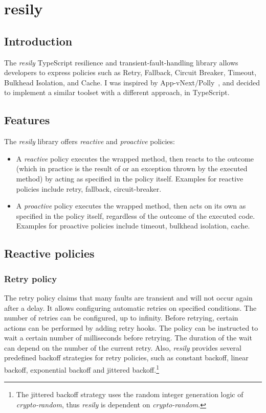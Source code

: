 \section{resily}

\subsection{Introduction}

The \emph{resily} TypeScript resilience and transient-fault-handling library allows developers to express policies such as Retry, Fallback, Circuit Breaker, Timeout, Bulkhead Isolation, and Cache. I was inspired by App-vNext/Polly~\cite{pollygithub}, and decided to implement a similar toolset with a different approach, in TypeScript.

\subsection{Features}

The \emph{resily} library offers \emph{reactive} and \emph{proactive} policies:

\begin{itemize}
\item A \emph{reactive} policy executes the wrapped method, then reacts to the outcome (which in practice is the result of or an exception thrown by the executed method) by acting as specified in the policy itself. Examples for reactive policies include retry, fallback, circuit-breaker.
\item A \emph{proactive} policy executes the wrapped method, then acts on its own as specified in the policy itself, regardless of the outcome of the executed code. Examples for proactive policies include timeout, bulkhead isolation, cache.
\end{itemize}

\subsection{Reactive policies}

\subsubsection{Retry policy}

The retry policy claims that many faults are transient and will not occur again after a delay. It allows configuring automatic retries on specified conditions. The number of retries can be configured, up to infinity. Before retrying, certain actions can be performed by adding retry hooks. The policy can be instructed to wait a certain number of milliseconds before retrying. The duration of the wait can depend on the number of the current retry. Also, \emph{resily} provides several predefined backoff strategies for retry policies, such as constant backoff, linear backoff, exponential backoff and jittered backoff.\footnote{The jittered backoff strategy uses the random integer generation logic of \emph{crypto-random}, thus \emph{resily} is dependent on \emph{crypto-random}.}

